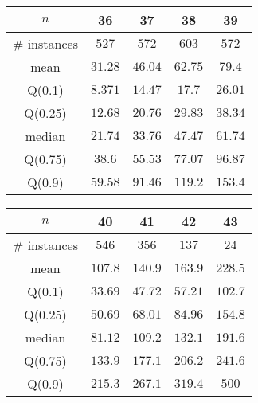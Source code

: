 \begin{tabular}{c|cccc} 
\hline 
$n$ & 36 & 37 & 38 & 39 \tabularnewline 
\hline 
\hline 
\# instances & $527$ & $572$ & $603$ & $572$ \tabularnewline 
mean & $31.28$ & $46.04$ & $62.75$ & $79.4$ \tabularnewline 
Q(0.1) & $8.371$ & $14.47$ & $17.7$ & $26.01$ \tabularnewline 
Q(0.25) & $12.68$ & $20.76$ & $29.83$ & $38.34$ \tabularnewline 
median & $21.74$ & $33.76$ & $47.47$ & $61.74$ \tabularnewline 
Q(0.75) & $38.6$ & $55.53$ & $77.07$ & $96.87$ \tabularnewline 
Q(0.9) & $59.58$ & $91.46$ & $119.2$ & $153.4$ \tabularnewline 
\hline 
\end{tabular} 
\medskip{} 

\begin{tabular}{c|cccc} 
\hline 
$n$ & 40 & 41 & 42 & 43 \tabularnewline 
\hline 
\hline 
\# instances & $546$ & $356$ & $137$ & $24$ \tabularnewline 
mean & $107.8$ & $140.9$ & $163.9$ & $228.5$ \tabularnewline 
Q(0.1) & $33.69$ & $47.72$ & $57.21$ & $102.7$ \tabularnewline 
Q(0.25) & $50.69$ & $68.01$ & $84.96$ & $154.8$ \tabularnewline 
median & $81.12$ & $109.2$ & $132.1$ & $191.6$ \tabularnewline 
Q(0.75) & $133.9$ & $177.1$ & $206.2$ & $241.6$ \tabularnewline 
Q(0.9) & $215.3$ & $267.1$ & $319.4$ & $500$ \tabularnewline 
\hline 
\end{tabular} 
\medskip{} 

